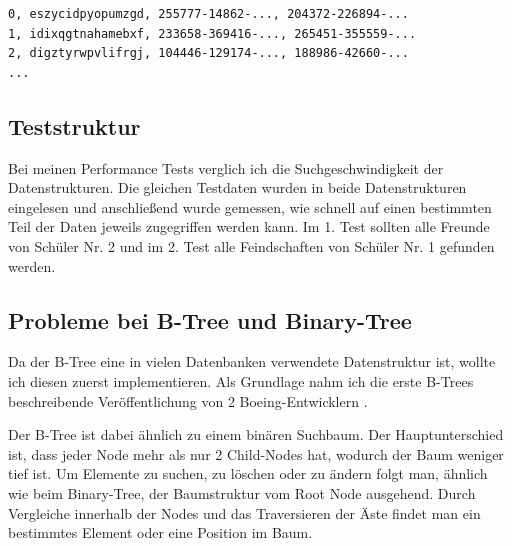 \documentclass[11pt,a4paper]{article}
\begin{document}
\begin{lstlisting}
0, eszycidpyopumzgd, 255777-14862-..., 204372-226894-...
1, idixqgtnahamebxf, 233658-369416-..., 265451-355559-...
2, digztyrwpvlifrgj, 104446-129174-..., 188986-42660-...
...
\end{lstlisting}


\subsection{Teststruktur}

Bei meinen Performance Tests verglich ich die Suchgeschwindigkeit der Datenstrukturen.
Die gleichen Testdaten wurden in beide Datenstrukturen eingelesen und anschließend
wurde gemessen, wie schnell auf einen bestimmten Teil der Daten jeweils zugegriffen
werden kann. Im 1. Test sollten alle Freunde von Schüler Nr. 2 und im 2. Test alle
Feindschaften von Schüler Nr. 1 gefunden werden.

\subsection{Probleme bei B-Tree und Binary-Tree}

Da der B-Tree eine in vielen Datenbanken verwendete Datenstruktur ist, wollte ich
diesen zuerst implementieren. Als Grundlage nahm ich die erste B-Trees beschreibende
Veröffentlichung von 2 Boeing-Entwicklern \cite{boeing_engineers}.

\vspace*{0.3cm}

Der B-Tree ist dabei ähnlich zu einem binären Suchbaum.
Der Hauptunterschied ist, dass jeder Node mehr als nur 2 Child-Nodes
hat, wodurch der Baum weniger tief ist.
Um Elemente zu suchen, zu löschen oder zu ändern folgt man, ähnlich wie beim
Binary-Tree, der Baumstruktur vom Root Node ausgehend.
Durch Vergleiche innerhalb der Nodes und das Traversieren der
Äste findet man ein bestimmtes Element oder eine Position im Baum.
\end{document}
